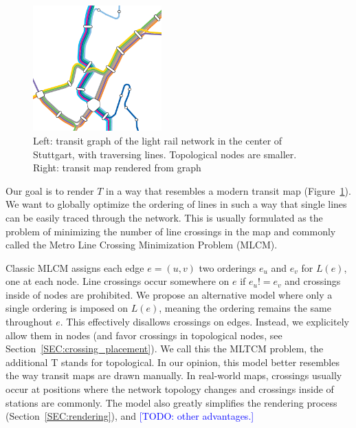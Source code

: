 \documentclass{llncs}
\newcommand\todo[1]{\textcolor{blue}{[TODO: #1]}}
\begin{document}
\begin{figure}
  \centering
	
	\hspace{.5cm}
    \includegraphics[trim={0cm 0 2.47cm 4.22cm},clip,width=0.44\textwidth]{render_examples/vvs_cropped.pdf}
	\caption{Left: transit graph of the light rail network in the center of Stuttgart, with traversing lines. Topological nodes are smaller. Right: transit map rendered from graph}
	\label{FIG:transitgraphvvs}
\end{figure}

Our goal is to render $T$ in a way that resembles a modern transit map (Figure~\ref{FIG:transitgraphvvs}). We want to globally optimize the ordering of lines in such a way that single lines can be easily traced through the network. This is usually formulated as the problem of minimizing the number of line crossings in the map and commonly called the Metro Line Crossing Minimization Problem (MLCM).

Classic MLCM assigns each edge $e=(u, v)$ two orderings $e_{u}$ and $e_{v}$ for $L(e)$, one at each node. Line crossings occur somewhere on $e$ if $e_{u} != e_{v}$ and crossings inside of nodes are prohibited. We propose an alternative model where only a single ordering is imposed on $L(e)$, meaning the ordering remains the same throughout $e$. This effectively disallows crossings on edges. Instead, we explicitely allow them in nodes (and favor crossings in topological nodes, see Section~\ref{SEC:crossing_placement}). We call this the MLTCM problem, the additional T stands for topological. In our opinion, this model better resembles the way transit maps are drawn manually. In real-world maps, crossings usually occur at positions where the network topology changes and crossings inside of stations are commonly. The model also greatly simplifies the rendering process (Section~\ref{SEC:rendering}), and \todo{other advantages.}
\end{document}

